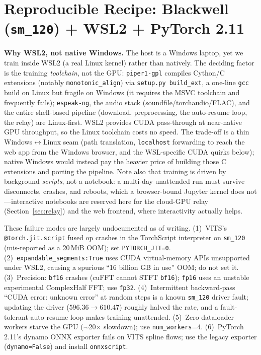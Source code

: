 \documentclass[conference]{IEEEtran}
\begin{document}
\appendices
\section{Reproducible Recipe: Blackwell (\texttt{sm\_120}) + WSL2 + PyTorch 2.11}
\label{app:recipe}

\textbf{Why WSL2, not native Windows.} The host is a Windows laptop, yet we train inside WSL2 (a real Linux
kernel) rather than natively. The deciding factor is the training \emph{toolchain}, not the GPU:
\texttt{piper1-gpl} compiles Cython/C extensions (notably \texttt{monotonic\_align}) via
\texttt{setup.py build\_ext}, a one-line \texttt{gcc} build on Linux but fragile on Windows (it requires the
MSVC toolchain and frequently fails); \texttt{espeak-ng}, the audio stack (soundfile/torchaudio/FLAC), and the
entire shell-based pipeline (download, preprocessing, the auto-resume loop, the relay) are Linux-first. WSL2
provides CUDA pass-through at near-native GPU throughput, so the Linux toolchain costs no speed. The trade-off
is a thin Windows$\leftrightarrow$Linux seam (path translation, \texttt{localhost} forwarding to reach the web
app from the Windows browser, and the WSL-specific CUDA quirks below); native Windows would instead pay the
heavier price of building those C extensions and porting the pipeline. Note also that training is driven by
background \emph{scripts}, not a notebook: a multi-day unattended run must survive disconnects, crashes, and
reboots, which a browser-bound Jupyter kernel does not---interactive notebooks are reserved here for the
cloud-GPU relay (Section~\ref{sec:relay}) and the web frontend, where interactivity actually helps.

These failure modes are largely undocumented as of writing.
(1)~VITS's \texttt{@torch.jit.script} fused op crashes in the TorchScript interpreter on \texttt{sm\_120}
(mis-reported as a 20\,MiB OOM); set \texttt{PYTORCH\_JIT=0}.
(2)~\texttt{expandable\_segments:True} uses CUDA virtual-memory APIs unsupported under WSL2, causing a
spurious ``16 billion GB in use'' OOM; do not set it.
(3)~Precision: \texttt{bf16} crashes (cuFFT cannot STFT \texttt{bf16}); \texttt{fp16} uses an unstable
experimental ComplexHalf FFT; use \texttt{fp32}.
(4)~Intermittent backward-pass ``CUDA error: unknown error'' at random steps is a known \texttt{sm\_120}
driver fault; updating the driver ($596.36 \rightarrow 610.47$) roughly halved the rate, and a fault-tolerant
auto-resume loop makes training unattended.
(5)~Zero dataloader workers starve the GPU ($\sim$20$\times$ slowdown); use \texttt{num\_workers}=4.
(6)~PyTorch 2.11's dynamo ONNX exporter fails on VITS spline flows; use the legacy exporter
(\texttt{dynamo=False}) and install \texttt{onnxscript}.
\end{document}
